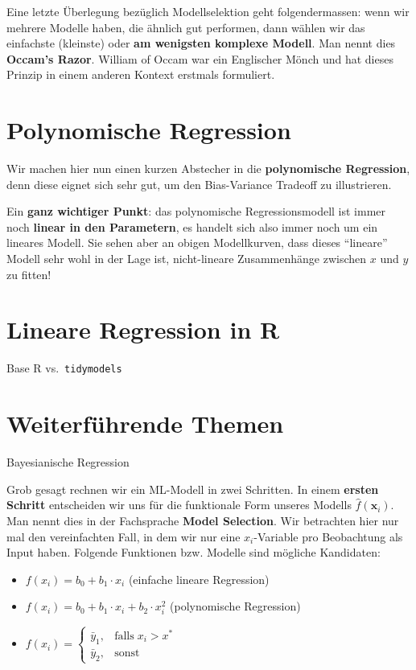 \documentclass[
]{book}
\providecommand{\tightlist}{%
  \setlength{\itemsep}{0pt}\setlength{\parskip}{0pt}}
\begin{document}
Eine letzte Überlegung bezüglich Modellselektion geht folgendermassen: wenn wir mehrere Modelle haben, die ähnlich gut performen, dann wählen wir das einfachste (kleinste) oder \textbf{am wenigsten komplexe Modell}. Man nennt dies \textbf{Occam's Razor}. William of Occam war ein Englischer Mönch und hat dieses Prinzip in einem anderen Kontext erstmals formuliert.

\hypertarget{polynomische-regression}{%
\section{Polynomische Regression}\label{polynomische-regression}}

Wir machen hier nun einen kurzen Abstecher in die \textbf{polynomische Regression}, denn diese eignet sich sehr gut, um den Bias-Variance Tradeoff zu illustrieren.

Ein \textbf{ganz wichtiger Punkt}: das polynomische Regressionsmodell ist immer noch \textbf{linear in den Parametern}, es handelt sich also immer noch um ein lineares Modell. Sie sehen aber an obigen Modellkurven, dass dieses ``lineare'' Modell sehr wohl in der Lage ist, nicht-lineare Zusammenhänge zwischen \(x\) und \(y\) zu fitten!

\hypertarget{lineare-regression-in-r}{%
\section{Lineare Regression in R}\label{lineare-regression-in-r}}

Base R vs.~\texttt{tidymodels}

\hypertarget{weiterfuxfchrende-themen}{%
\section{Weiterführende Themen}\label{weiterfuxfchrende-themen}}

Bayesianische Regression

Grob gesagt rechnen wir ein ML-Modell in zwei Schritten. In einem \textbf{ersten Schritt} entscheiden wir uns für die funktionale Form unseres Modells \(\hat{f}(\mathbf{x}_i)\). Man nennt dies in der Fachsprache \textbf{Model Selection}. Wir betrachten hier nur mal den vereinfachten Fall, in dem wir nur eine \(x_i\)-Variable pro Beobachtung als Input haben. Folgende Funktionen bzw. Modelle sind mögliche Kandidaten:

\begin{itemize}
\tightlist
\item
  \(f(x_i) = b_0 + b_1 \cdot x_i\) (einfache lineare Regression)
\item
  \(f(x_i) = b_0 + b_1 \cdot x_i + b_2 \cdot x_i^2\) (polynomische Regression)
\item
  \(f(x_i) = \begin{cases} \bar{y}_1, & \text{falls}\; x_i > x^*\\ \bar{y}_2, & \text{sonst} \end{cases}\)
\end{itemize}
\end{document}
